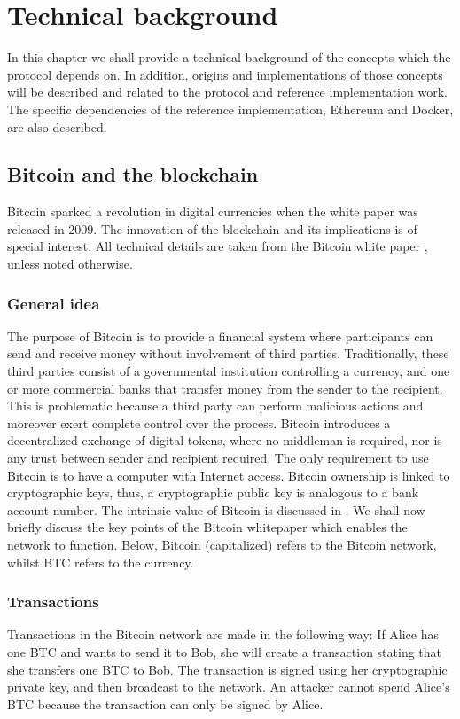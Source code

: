 \chapter{Technical background}
In this chapter we shall provide a technical background of the concepts which the protocol depends on. In addition, origins and implementations of those concepts will be described and related to the protocol and reference implementation work. The specific dependencies of the reference implementation, Ethereum and Docker, are also described.

\section{Bitcoin and the blockchain}
Bitcoin sparked a revolution in digital currencies when the white paper was released in 2009. The innovation of the blockchain and its implications is of special interest. All technical details are taken from the Bitcoin white paper \cite{btc}, unless noted otherwise.

\subsection{General idea}
The purpose of Bitcoin is to provide a financial system where participants can send and receive money without involvement of third parties. Traditionally, these third parties consist of a governmental institution controlling a currency, and one or more commercial banks that transfer money from the sender to the recipient. This is problematic because a third party can perform malicious actions and moreover exert complete control over the process. Bitcoin introduces a decentralized exchange of digital tokens, where no middleman is required, nor is any trust between sender and recipient required. The only requirement to use Bitcoin is to have a computer with Internet access. Bitcoin ownership is linked to cryptographic keys, thus, a cryptographic public key is analogous to a bank account number. The intrinsic value of Bitcoin is discussed in \cite{buterin:2011}. We shall now briefly discuss the key points of the Bitcoin whitepaper which enables the network to function. Below, Bitcoin (capitalized) refers to the Bitcoin network, whilst BTC refers to the currency.

\subsection{Transactions}
Transactions in the Bitcoin network are made in the following way: If Alice has one BTC and wants to send it to Bob, she will create a transaction stating that she transfers one BTC to Bob. The transaction is signed using her cryptographic private key, and then broadcast to the network. An attacker cannot spend Alice's BTC because the transaction can only be signed by Alice.

